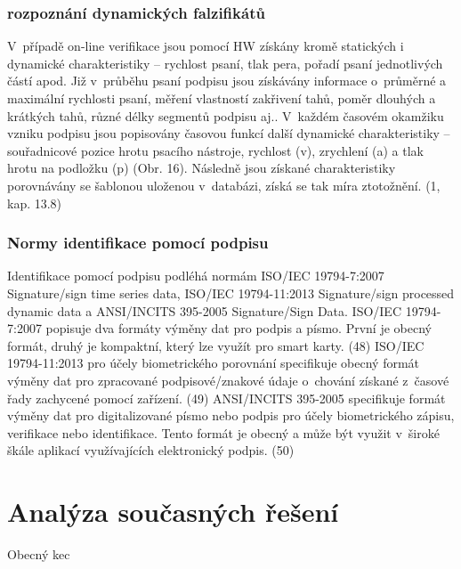 \subsection{rozpoznání dynamických falzifikátů} %
V~případě on-line verifikace jsou pomocí HW získány kromě statických i dynamické
charakteristiky – rychlost psaní, tlak pera, pořadí psaní jednotlivých částí apod. Již v~průběhu
psaní podpisu jsou získávány informace o~průměrné a maximální rychlosti psaní, měření
vlastností zakřivení tahů, poměr dlouhých a krátkých tahů, různé délky segmentů podpisu aj..
V~každém časovém okamžiku vzniku podpisu jsou popisovány časovou funkcí další
dynamické charakteristiky – souřadnicové pozice hrotu psacího nástroje, rychlost (v),
zrychlení (a) a tlak hrotu na podložku (p) (Obr. 16). Následně jsou získané charakteristiky
porovnávány se šablonou uloženou v~databázi, získá se tak míra ztotožnění. (1, kap. 13.8) %


\subsection{Normy identifikace pomocí podpisu}
Identifikace pomocí podpisu podléhá normám ISO/IEC 19794-7:2007 Signature/sign time
series data, ISO/IEC 19794-11:2013 Signature/sign processed dynamic data a ANSI/INCITS
395-2005 Signature/Sign Data.
ISO/IEC 19794-7:2007 popisuje dva formáty výměny dat pro podpis a písmo. První je obecný
formát, druhý je kompaktní, který lze využít pro smart karty. (48) %
ISO/IEC 19794-11:2013 pro účely biometrického porovnání specifikuje obecný formát
výměny dat pro zpracované podpisové/znakové údaje o~chování získané z~časové řady
zachycené pomocí zařízení. (49) %
ANSI/INCITS 395-2005 specifikuje formát výměny dat pro digitalizované písmo nebo podpis
pro účely biometrického zápisu, verifikace nebo identifikace. Tento formát je obecný a může
být využit v~široké škále aplikací využívajících elektronický podpis. (50) %

\chapter{Analýza současných řešení}
Obecný kec

